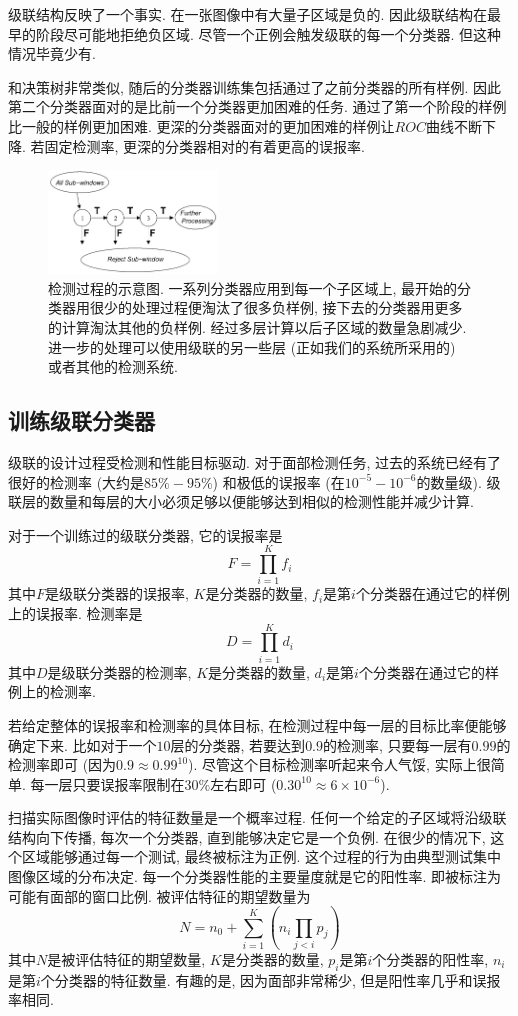 \documentclass[a4paper,utf8,11pt, onecolumn]{ctexart}
\begin{document}
级联结构反映了一个事实. 在一张图像中有大量子区域是负的. 因此级联结构在最早的阶段尽可能地拒绝负区域. 尽管一个正例会触发级联的每一个分类器. 但这种情况毕竟少有.

和决策树非常类似, 随后的分类器训练集包括通过了之前分类器的所有样例. 因此第二个分类器面对的是比前一个分类器更加困难的任务. 通过了第一个阶段的样例比一般的样例更加困难. 更深的分类器面对的更加困难的样例让$ROC$曲线不断下降. 若固定检测率, 更深的分类器相对的有着更高的误报率.
\begin{figure}
\centering
\includegraphics[width=0.4\textwidth]{process.png}
\caption{检测过程的示意图. 一系列分类器应用到每一个子区域上, 最开始的分类器用很少的处理过程便淘汰了很多负样例, 接下去的分类器用更多的计算淘汰其他的负样例. 经过多层计算以后子区域的数量急剧减少. 进一步的处理可以使用级联的另一些层 (正如我们的系统所采用的) 或者其他的检测系统.}
\label{fig:process}
\end{figure}

\subsection{训练级联分类器}\label{sec:train_cascade}
级联的设计过程受检测和性能目标驱动. 对于面部检测任务, 过去的系统已经有了很好的检测率 (大约是$85\%-95\%$) 和极低的误报率 (在$10^{-5}-10^{-6}$的数量级). 级联层的数量和每层的大小必须足够以便能够达到相似的检测性能并减少计算.

对于一个训练过的级联分类器, 它的误报率是
\[
F=\prod_{i=1}^{K}f_i
\]
其中$F$是级联分类器的误报率, $K$是分类器的数量, $f_i$是第$i$个分类器在通过它的样例上的误报率. 检测率是
\[
    D=\prod_{i=1}^{K}d_i
\]
其中$D$是级联分类器的检测率, $K$是分类器的数量, $d_i$是第$i$个分类器在通过它的样例上的检测率.

若给定整体的误报率和检测率的具体目标, 在检测过程中每一层的目标比率便能够确定下来. 比如对于一个$10$层的分类器, 若要达到$0.9$的检测率, 只要每一层有$0.99$的检测率即可 (因为$0.9\approx0.99^{10}$). 尽管这个目标检测率听起来令人气馁, 实际上很简单. 每一层只要误报率限制在$30\%$左右即可 ($0.30^{10}\approx6\times10^{-6}$).

扫描实际图像时评估的特征数量是一个概率过程. 任何一个给定的子区域将沿级联结构向下传播, 每次一个分类器, 直到能够决定它是一个负例. 在很少的情况下, 这个区域能够通过每一个测试, 最终被标注为正例. 这个过程的行为由典型测试集中图像区域的分布决定. 每一个分类器性能的主要量度就是它的阳性率. 即被标注为可能有面部的窗口比例. 被评估特征的期望数量为
\[
N=n_0+\sum_{i=1}^{K}\left(n_i\prod_{j<i}p_j\right)
\]
其中$N$是被评估特征的期望数量, $K$是分类器的数量, $p_i$是第$i$个分类器的阳性率, $n_i$是第$i$个分类器的特征数量. 有趣的是, 因为面部非常稀少, 但是阳性率几乎和误报率相同.
\end{document}
